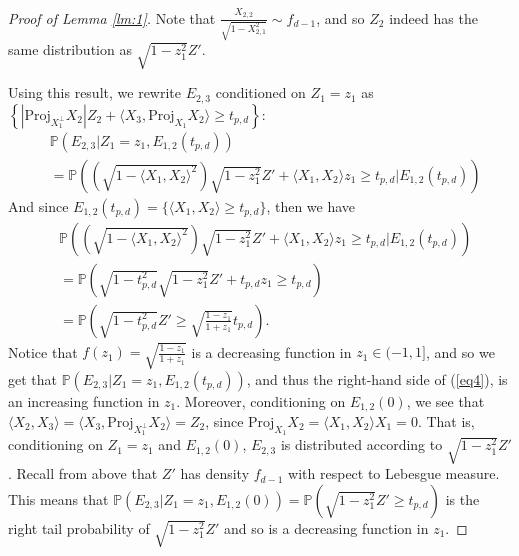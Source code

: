 \documentclass{article}
\begin{document}
\begin{proof}[Proof of Lemma \ref{lm:1}]
Note that $\frac{X_{2,2}}{\sqrt{1 - X_{2,1}^2}} \sim f_{d-1}$, and so $Z_2$ indeed has the same distribution as $\sqrt{1 - z_1^2}Z'$.

Using this result, we rewrite $E_{2,3}$ conditioned on $Z_1 = z_1$ as $\left\{ \left|\text{Proj}_{X_1^{\perp}}X_2 \right| Z_2 + \langle X_3, \text{Proj}_{X_1}X_2 \rangle \geq t_{p,d} \right\}$:
\begin{align*}
    &\mathbb{P}(E_{2,3} | Z_1 = z_1, E_{1,2}(t_{p,d}))\\
    &= \mathbb{P} \left( \left(\sqrt{1 - \langle X_1, X_2 \rangle^2} \right)\sqrt{1 - z_1^2}Z' +  \langle X_1, X_2 \rangle z_1 \geq t_{p,d}  | E_{1,2}(t_{p,d}) \right)
\end{align*}
And since $E_{1,2}(t_{p,d}) = \{ \langle X_1, X_2 \rangle \geq t_{p, d} \}$, then we have 
\begin{align}
    &\mathbb{P} \left( \left(\sqrt{1 - \langle X_1, X_2 \rangle^2} \right)\sqrt{1 - z_1^2}Z' +  \langle X_1, X_2 \rangle z_1 \geq t_{p,d}  | E_{1,2}(t_{p,d}) \right) \nonumber\\
    &= \mathbb{P} \left( \sqrt{1 - t_{p,d}^2} \sqrt{1 - z_1^2}Z' +   t_{p,d}z_1 \geq t_{p,d} \right) \nonumber\\
    &= \mathbb{P} \left( \sqrt{1 - t_{p,d}^2} Z' \geq \sqrt{\frac{1-z_1}{1+z_1}} t_{p,d} \right)\label{eq6}.
\end{align}
Notice that $f(z_1) = \sqrt{\frac{1-z_1}{1+z_1}}$ is a decreasing function in $z_1 \in (-1, 1]$, and so we get that $\mathbb{P}(E_{2,3} | Z_1 = z_1, E_{1,2}(t_{p,d}))$, and thus the right-hand side of (\ref{eq4}), is an increasing function in $z_1$. Moreover, conditioning on $E_{1,2}(0)$, we see that $\langle X_2, X_3 \rangle = \langle X_3, \text{Proj}_{X_1^{\perp}}X_2 \rangle = Z_2$, since $\text{Proj}_{X_1}X_2 = \langle X_1, X_2 \rangle X_1 = 0$. That is, conditioning on $Z_1 = z_1$ and $E_{1,2}(0)$, $E_{2,3}$ is distributed according to $\sqrt{1 - z_1^2}Z'$. Recall from above that $Z'$ has density $f_{d-1}$ with respect to Lebesgue measure. This means that $\mathbb{P} (E_{2,3} | Z_1 = z_1, E_{1,2}(0)) = \mathbb{P}(\sqrt{1 - z_1^2}Z' \geq t_{p,d})$ is the right tail probability of $\sqrt{1 - z_1^2}Z'$ and so is a decreasing function in $z_1$.


\end{proof}
\end{document}
